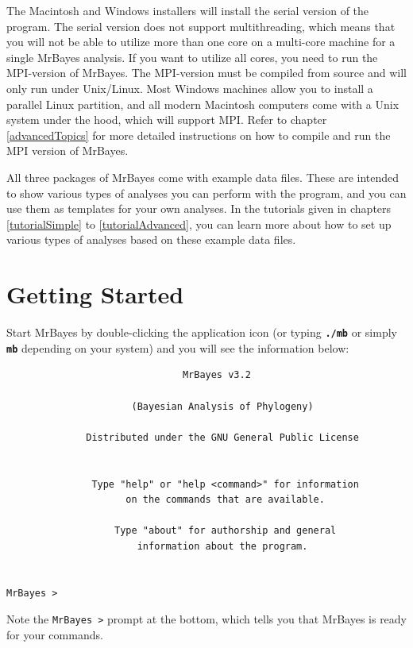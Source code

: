 \documentclass[12pt]{book}
\newcommand{\ttt}[1]{\texttt{#1} }
\newcommand{\tb}[1]{\texttt{\textbf{#1}} }
\begin{document}
The Macintosh and Windows installers will install the serial version of the program. The
serial version does not support multithreading, which means that you will not be able
to utilize more than one core on a multi-core machine for a single MrBayes analysis. If
you want to utilize all cores, you need to run the MPI-version of MrBayes. The MPI-version
must be compiled from source and will only run under Unix/Linux. Most Windows machines
allow you to install a parallel Linux partition, and all modern Macintosh computers come with a
Unix system under the hood, which will support MPI. Refer to chapter \ref{advancedTopics} for
more detailed instructions on how to compile and run the MPI version of MrBayes.

All three packages of MrBayes come with example data files. These are intended to show
various types of analyses you can perform with the program, and you can use them as
templates for your own analyses. In the tutorials given in chapters \ref{tutorialSimple}
to \ref{tutorialAdvanced}, you can learn more about how to set up various types of 
analyses based on these example data files.

\section{Getting Started}
Start MrBayes by double-clicking the application icon (or typing \tb{./mb} or simply \tb{mb} depending
on your system) and you will see the information below:

\begin{singlespacing}
\small
\begin{verbatim}
                               MrBayes v3.2

                      (Bayesian Analysis of Phylogeny)

              Distributed under the GNU General Public License


               Type "help" or "help <command>" for information
                     on the commands that are available.

                   Type "about" for authorship and general
                       information about the program.


MrBayes >
\end{verbatim}
\normalsize
\end{singlespacing}

Note the \ttt{MrBayes >} prompt at the bottom, which tells you that MrBayes is ready for your commands.
\end{document}
